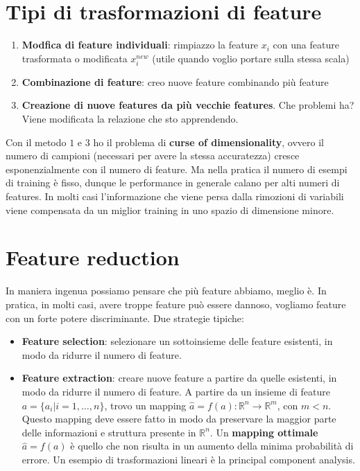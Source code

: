 \section{Tipi di trasformazioni di feature}
\begin{enumerate}
	\item \textbf{Modfica di feature individuali}: rimpiazzo la feature $x_i$ con una feature trasformata o modificata $x_i^{new}$ (utile quando voglio portare sulla stessa scala)
	\item \textbf{Combinazione di feature}: creo nuove feature combinando più feature 
	\item \textbf{Creazione di nuove features da più vecchie features}. Che problemi ha? Viene modificata la relazione che sto apprendendo. 
\end{enumerate}
Con il metodo $1$ e $3$ ho il problema di \textbf{curse of dimensionality}, ovvero il numero di campioni (necessari per avere la stessa accuratezza) cresce esponenzialmente con il numero di feature. Ma nella pratica il numero di esempi di training è fisso, dunque le performance in generale calano per alti numeri di features.
In molti casi l'informazione che viene persa dalla rimozioni di variabili viene compensata da un miglior training in uno spazio di dimensione minore.
\section{Feature reduction}
In maniera ingenua possiamo pensare che più feature abbiamo, meglio è. In pratica, in molti casi, avere troppe feature può essere dannoso, vogliamo feature con un forte potere discriminante.
Due strategie tipiche:
\begin{itemize}
	\item \textbf{Feature selection}: selezionare un sottoinsieme delle feature esistenti, in modo da ridurre il numero di feature.
	\item \textbf{Feature extraction}: creare nuove feature a partire da quelle esistenti, in modo da ridurre il numero di feature.
	A partire da un insieme di feature $a=\{a_i|i=1,\ldots,n\}$, trovo un mapping $\hat{a}=f(a):\mathbb{R}^n\rightarrow\mathbb{R}^m$, con $m<n$.
	Questo mapping deve essere fatto in modo da preservare la maggior parte delle informazioni e struttura presente in $\mathbb{R}^n$.
	Un \textbf{mapping ottimale} $\hat{a}=f(a)$ è quello che non risulta in un aumento della minima probabilità di errore. Un esempio di trasformazioni lineari è la principal component analysis.
\end{itemize}

